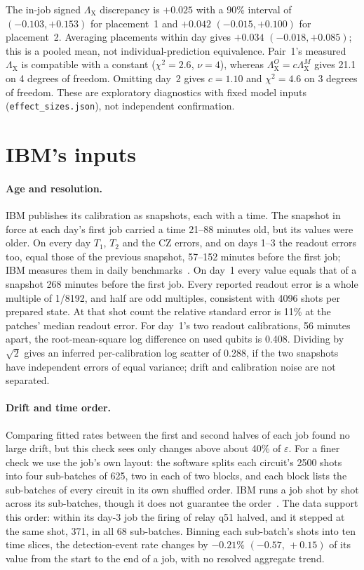 \documentclass[aps,pra,reprint,nofootinbib,longbibliography,floatfix,showkeys]{revtex4-2}
\newcommand{\eps}{\varepsilon}
\newcommand{\LX}{\Lambda_{\mathrm{X}}}
\newcommand{\ci}[2]{\ensuremath{(#1,\,#2)}}
\begin{document}
The in-job signed $\LX$ discrepancy is $+0.025$ with a 90\% interval of $(-0.103,+0.153)$ for placement~1 and $+0.042$ $(-0.015,+0.100)$ for placement~2.
Averaging placements within day gives $+0.034$ $(-0.018,+0.085)$; this is a pooled mean, not individual-prediction equivalence.
Pair~1's measured $\LX$ is compatible with a constant ($\chi^2=2.6$, $\nu=4$), whereas $\LX^O=c\LX^M$ gives 21.1 on 4 degrees of freedom.
Omitting day~2 gives $c=1.10$ and $\chi^2=4.6$ on 3 degrees of freedom.
These are exploratory diagnostics with fixed model inputs (\texttt{effect\_sizes.json}), not independent confirmation.

\section{IBM's inputs}
\label{app:inputs}

\paragraph*{Age and resolution.}
IBM publishes its calibration as snapshots, each with a time.
The snapshot in force at each day's first job carried a time 21--88 minutes old, but its values were older.
On every day $T_1$, $T_2$ and the CZ errors, and on days 1--3 the readout errors too, equal those of the previous snapshot, 57--152 minutes before the first job; IBM measures them in daily benchmarks~\cite{ibmdocscalib}.
On day~1 every value equals that of a snapshot 268 minutes before the first job.
Every reported readout error is a whole multiple of 1/8192, and half are odd multiples, consistent with 4096 shots per prepared state.
At that shot count the relative standard error is 11\% at the patches' median readout error.
For day~1's two readout calibrations, 56 minutes apart, the root-mean-square log difference on used qubits is 0.408.
Dividing by $\sqrt2$ gives an inferred per-calibration log scatter of 0.288, if the two snapshots have independent errors of equal variance; drift and calibration noise are not separated.

\paragraph*{Drift and time order.}
Comparing fitted rates between the first and second halves of each job found no large drift, but this check sees only changes above about 40\% of $\eps$.
For a finer check we use the job's own layout: the software splits each circuit's 2500 shots into four sub-batches of 625, two in each of two blocks, and each block lists the sub-batches of every circuit in its own shuffled order.
IBM runs a job shot by shot across its sub-batches, though it does not guarantee the order~\cite{ibmdocsinit}.
The data support this order: within its day-3 job the firing of relay q51 halved, and it stepped at the same shot, 371, in all 68 sub-batches.
Binning each sub-batch's shots into ten time slices, the detection-event rate changes by $-0.21\%$ \ci{-0.57}{+0.15} of its value from the start to the end of a job, with no resolved aggregate trend.
\end{document}
